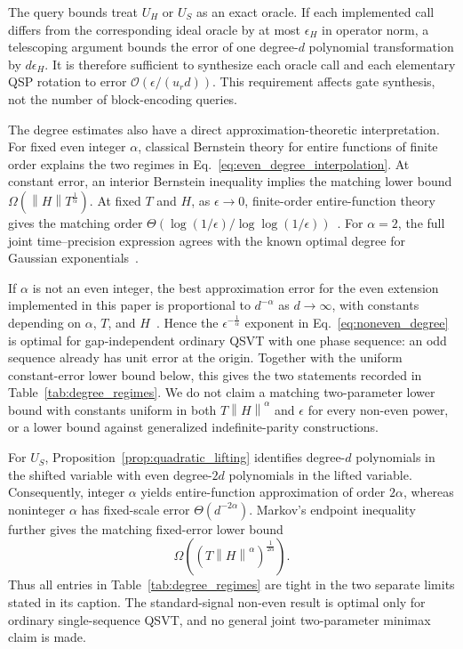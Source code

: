 \documentclass[aps,pra,reprint,floatfix,unsortedaddress,superscriptaddress]{revtex4-2}
\newcommand{\norm}[1]{\left\lVert#1\right\rVert}
\newcommand{\Ocal}{\mathcal{O}}
\begin{document}
The query bounds treat $U_H$ or $U_S$ as an exact oracle.  If each
implemented call differs from the corresponding ideal oracle by at
most $\epsilon_H$ in operator norm, a
telescoping argument bounds the error of one degree-$d$ polynomial
transformation
by $d\epsilon_H$.  It is therefore sufficient to synthesize each
oracle call and each elementary QSP rotation to error
$\Ocal(\epsilon/(u_r d))$.  This requirement affects gate synthesis,
not the number of block-encoding queries.

The degree estimates also have a direct approximation-theoretic
interpretation.  For fixed even integer $\alpha$, classical Bernstein
theory for entire functions of finite order explains the two regimes
in Eq.~\eqref{eq:even_degree_interpolation}.  At constant error, an interior
Bernstein inequality implies the matching lower bound
$\Omega(\norm{H}T^{\frac{1}{\alpha}})$.  At fixed $T$ and $H$, as
$\epsilon\rightarrow0$, finite-order entire-function theory gives the
matching order
$\Theta(\log(1/\epsilon)/\log\log(1/\epsilon))$~\cite{bernstein1912ordre,
timan1963theory,trefethen2019approximation}.
For $\alpha=2$, the
full joint time--precision expression agrees with the known optimal
degree for Gaussian exponentials~\cite{aggarwal2022optimaldegree}.

If $\alpha$ is not an even integer, the best approximation error for
the even extension implemented in this paper is proportional to
$d^{-\alpha}$ as $d\to\infty$, with constants depending on $\alpha$,
$T$, and $H$~\cite{bernstein1914sur,devore1993constructive,
ditzian1987moduli}.  Hence the
$\epsilon^{-\frac{1}{\alpha}}$ exponent in
Eq.~\eqref{eq:noneven_degree} is optimal for gap-independent ordinary
QSVT with one phase sequence: an odd sequence already has unit error at
the origin.  Together with the uniform
constant-error lower bound below, this gives the two statements
recorded in Table~\ref{tab:degree_regimes}.  We do not claim a matching
two-parameter lower bound with constants uniform in both
$T\norm{H}^{\alpha}$ and $\epsilon$ for every non-even power, or a
lower bound against generalized indefinite-parity constructions.

For $U_S$, Proposition~\ref{prop:quadratic_lifting} identifies
degree-$d$ polynomials in the shifted variable with even degree-$2d$
polynomials in the lifted variable. Consequently, integer $\alpha$
yields entire-function approximation of order $2\alpha$, whereas
noninteger $\alpha$ has fixed-scale error $\Theta(d^{-2\alpha})$.
Markov's endpoint inequality further gives the matching fixed-error
lower bound
\[
\Omega\!\left(
(T\norm{H}^{\alpha})^{\frac{1}{2\alpha}}
\right).
\]
Thus all entries in Table~\ref{tab:degree_regimes} are tight in the two
separate limits stated in its caption. The standard-signal non-even
result is optimal only for ordinary single-sequence QSVT, and no
general joint two-parameter minimax claim is made.
\end{document}
